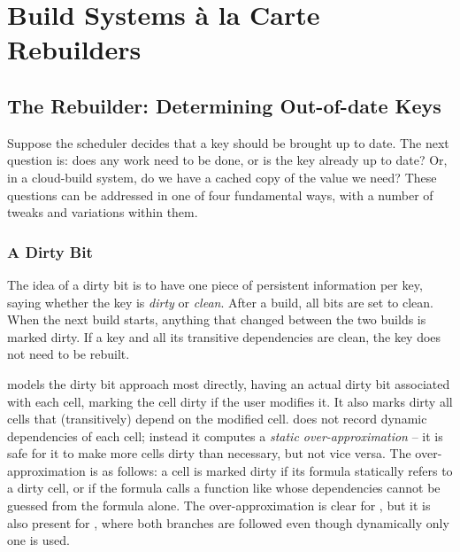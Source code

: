 \section{Build Systems \`a la Carte Rebuilders}\label{sec-build}




\subsection{The Rebuilder: Determining Out-of-date Keys}\label{sec-out-of-date}

Suppose the scheduler decides that a key should be brought up to date. The next
question is: does any work need to be done, or is the key already up to date?
Or, in a cloud-build system, do we have a cached copy of the value we need?
These questions can be addressed in one of four fundamental ways, with a number
of tweaks and variations within them.

\vspace{-2mm}
\subsubsection{A Dirty Bit}\label{sec-dirty-bit}

The idea of a dirty bit is to have one piece of persistent information per key,
saying whether the key is \emph{dirty} or \emph{clean}. After a build, all bits
are set to clean. When the next build starts, anything that changed between the
two builds is marked dirty. If a key and all its transitive dependencies are
clean, the key does not need to be rebuilt.

\Excel models the dirty bit approach most directly, having an actual dirty bit
associated with each cell, marking the cell dirty if the user modifies it.
It also marks dirty all cells that (transitively) depend on the modified cell.
\Excel does not record dynamic dependencies of each cell; instead it computes a
\emph{static over-approximation} -- it is safe for it to make more cells dirty
than necessary, but not vice versa. The over-approximation is as follows: a cell
is marked dirty if its formula statically refers to a dirty cell, or if the
formula calls a function like  whose dependencies cannot be
guessed from the formula alone. The over-approximation is clear for
, but it is also present for , where both branches are
followed even though dynamically only one is used.

